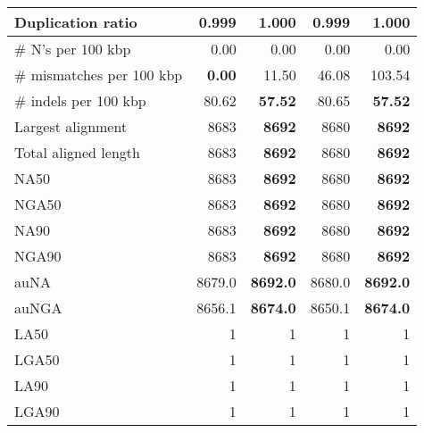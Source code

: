 \documentclass[12pt,a4paper]{article}
\begin{document}
\begin{table}[ht]
\begin{center}
\begin{tabular}{|l*{4}{|r}|}
Duplication ratio & {\bf 0.999} & 1.000 & {\bf 0.999} & 1.000 \\ \hline
\# N's per 100 kbp & 0.00 & 0.00 & 0.00 & 0.00 \\ \hline
\# mismatches per 100 kbp & {\bf 0.00} & 11.50 & 46.08 & 103.54 \\ \hline
\# indels per 100 kbp & 80.62 & {\bf 57.52} & 80.65 & {\bf 57.52} \\ \hline
Largest alignment & 8683 & {\bf 8692} & 8680 & {\bf 8692} \\ \hline
Total aligned length & 8683 & {\bf 8692} & 8680 & {\bf 8692} \\ \hline
NA50 & 8683 & {\bf 8692} & 8680 & {\bf 8692} \\ \hline
NGA50 & 8683 & {\bf 8692} & 8680 & {\bf 8692} \\ \hline
NA90 & 8683 & {\bf 8692} & 8680 & {\bf 8692} \\ \hline
NGA90 & 8683 & {\bf 8692} & 8680 & {\bf 8692} \\ \hline
auNA & 8679.0 & {\bf 8692.0} & 8680.0 & {\bf 8692.0} \\ \hline
auNGA & 8656.1 & {\bf 8674.0} & 8650.1 & {\bf 8674.0} \\ \hline
LA50 & 1 & 1 & 1 & 1 \\ \hline
LGA50 & 1 & 1 & 1 & 1 \\ \hline
LA90 & 1 & 1 & 1 & 1 \\ \hline
LGA90 & 1 & 1 & 1 & 1 \\ \hline
\end{tabular}
\end{center}
\end{table}
\end{document}
